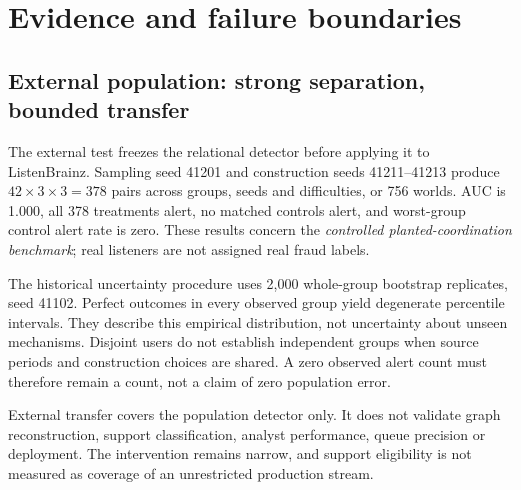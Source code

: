 \documentclass[sigconf,nonacm]{acmart}
\newcommand{\scope}{\textit{controlled planted-coordination benchmark}}
\begin{document}
\section{Evidence and failure boundaries}
\subsection{External population: strong separation, bounded transfer}
The external test freezes the relational detector before applying it to ListenBrainz. Sampling seed 41201 and construction seeds 41211--41213 produce $42\times3\times3=378$ pairs across groups, seeds and difficulties, or 756 worlds. AUC is 1.000, all 378 treatments alert, no matched controls alert, and worst-group control alert rate is zero. These results concern the \scope; real listeners are not assigned real fraud labels.

The historical uncertainty procedure uses 2,000 whole-group bootstrap replicates, seed 41102. Perfect outcomes in every observed group yield degenerate percentile intervals. They describe this empirical distribution, not uncertainty about unseen mechanisms. Disjoint users do not establish independent groups when source periods and construction choices are shared. A zero observed alert count must therefore remain a count, not a claim of zero population error.

External transfer covers the population detector only. It does not validate graph reconstruction, support classification, analyst performance, queue precision or deployment. The intervention remains narrow, and support eligibility is not measured as coverage of an unrestricted production stream.
\end{document}
